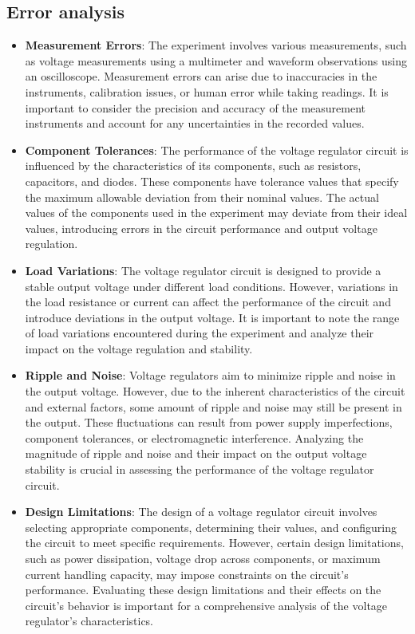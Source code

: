\documentclass[UTF8]{article}
\begin{document}
\subsection{Error analysis}
\begin{itemize}
\item \textbf{Measurement Errors}: The experiment involves various measurements, such as voltage measurements using a multimeter and waveform observations using an oscilloscope. Measurement errors can arise due to inaccuracies in the instruments, calibration issues, or human error while taking readings. It is important to consider the precision and accuracy of the measurement instruments and account for any uncertainties in the recorded values.

\item \textbf{Component Tolerances}: The performance of the voltage regulator circuit is influenced by the characteristics of its components, such as resistors, capacitors, and diodes. These components have tolerance values that specify the maximum allowable deviation from their nominal values. The actual values of the components used in the experiment may deviate from their ideal values, introducing errors in the circuit performance and output voltage regulation.

\item \textbf{Load Variations}: The voltage regulator circuit is designed to provide a stable output voltage under different load conditions. However, variations in the load resistance or current can affect the performance of the circuit and introduce deviations in the output voltage. It is important to note the range of load variations encountered during the experiment and analyze their impact on the voltage regulation and stability.

\item \textbf{Ripple and Noise}: Voltage regulators aim to minimize ripple and noise in the output voltage. However, due to the inherent characteristics of the circuit and external factors, some amount of ripple and noise may still be present in the output. These fluctuations can result from power supply imperfections, component tolerances, or electromagnetic interference. Analyzing the magnitude of ripple and noise and their impact on the output voltage stability is crucial in assessing the performance of the voltage regulator circuit.

\item \textbf{Design Limitations}: The design of a voltage regulator circuit involves selecting appropriate components, determining their values, and configuring the circuit to meet specific requirements. However, certain design limitations, such as power dissipation, voltage drop across components, or maximum current handling capacity, may impose constraints on the circuit's performance. Evaluating these design limitations and their effects on the circuit's behavior is important for a comprehensive analysis of the voltage regulator's characteristics.
\end{itemize}
\end{document}
